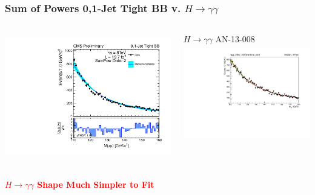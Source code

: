 \documentclass{beamer}
\begin{document}
\begin{frame}
\frametitle{Sum of Powers 0,1-Jet Tight BB v. $H\rightarrow\gamma\gamma$}
  \begin{columns}[c]
   \column{60mm}
      \begin{center}
        \includegraphics[height=55mm]{2013-10-04SystematicBiasStudy1/order_Shape_Jets01PassPtG10BB_SumPow2}
      \end{center}
   \column{60mm}
      \begin{center}
        $H\rightarrow\gamma\gamma$ AN-13-008 \\
        \includegraphics[height=42mm]{2013-10-04SystematicBiasStudy1/truth_hgg_8TeV_2013moriond_cic0_1Pow}
      \end{center}
  \end{columns}
  \begin{center}
    \bf
    \textcolor{red}{
    $H\rightarrow\gamma\gamma$ Shape Much Simpler to Fit
    }
  \end{center}
\end{frame}
\end{document}
